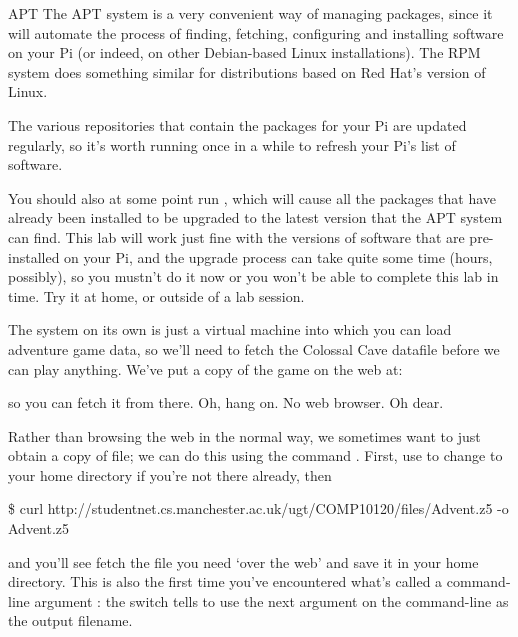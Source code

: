 \begin{rpi}{APT}
The APT system is a very convenient way of managing packages, since it will automate the process of finding, fetching, configuring and installing software on your Pi (or indeed, on other Debian-based Linux installations). The RPM system does something similar for distributions based on Red Hat's version of Linux.

The various repositories that contain the packages for your Pi are updated regularly, so it's worth running  once in a while to refresh your Pi's list of software.

You should also at some point run , which will cause all the packages that have already been installed to be upgraded to the latest version that the APT system can find. This lab will work just fine with the versions of software that are pre-installed on your Pi, and the upgrade process can take quite some time (hours, possibly), so you mustn't do it now or you won't be able to complete this lab in time. Try it at home, or outside of a lab session.
\end{rpi}

The  system on its own is just a virtual machine into which you can load adventure game data, so we'll need to fetch the Colossal Cave datafile before we can play anything. We've put a copy of the game on the web at:

\noindent {}

\noindent so you can fetch it from there. Oh, hang on. No web browser. Oh dear.

Rather than browsing the web in the normal way, we sometimes want to just obtain a copy of file; we can do this using the command  . First, use  to change to your home directory if you're not there already, then

\begin{ttoutenv}
\footnotesize
\$ curl http://studentnet.cs.manchester.ac.uk/ugt/COMP10120/files/Advent.z5 -o Advent.z5
\end{ttoutenv}

\noindent and you'll see  fetch the file you need `over the web' and save it in your home directory. This is also the first time you've encountered what's called a command-line argument : the  switch tells  to use the next argument on the command-line as the output filename.

